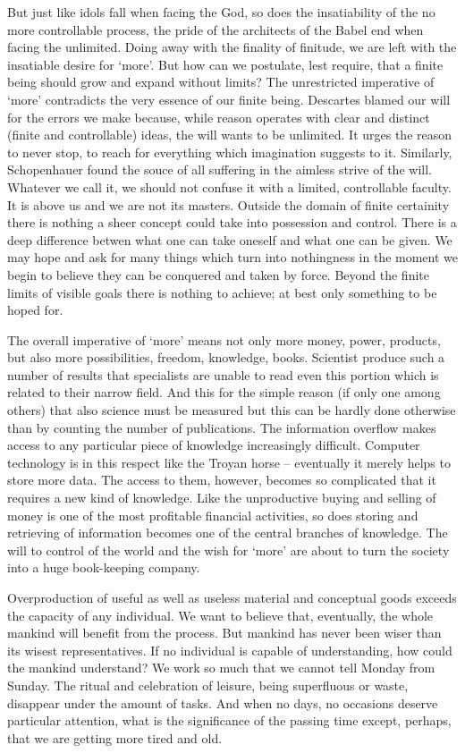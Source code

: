 But just like idols fall when facing the God, so does the insatiability of
the no more controllable process, the pride of the architects of the Babel
 end when facing the unlimited. Doing away with the
finality of finitude, we are left with the insatiable desire for `more'. 
But how can we postulate, lest require, that a finite being should grow and 
expand without limits? The unrestricted imperative of `more' contradicts the 
very essence of our finite being. 
Descartes
blamed our will for the errors we make because, while reason operates with
clear and distinct (finite and controllable) ideas, the will wants to be
unlimited. It urges the reason to never stop, to reach for everything which
imagination suggests to it. 
Similarly, Schopenhauer found the souce of all suffering in the aimless
strive of the will. Whatever we call it, we should not confuse it with 
a limited, controllable faculty. It is above us and we are not its masters.
Outside the domain of finite certainity there
is nothing a sheer concept could take into possession and control. There is a deep
difference betwen what one can take oneself and what one can be given.
We may hope and ask for many things which turn into nothingness in the moment we 
begin to believe they can be conquered and taken by force.
Beyond the finite limits of visible goals
there is nothing to achieve; at best only something to be hoped for.

The overall imperative of `more' means not only more money, power, products,
but also more possibilities, freedom, knowledge, books. 
Scientist produce such a number of results that specialists are unable to read
even this portion which is related to their narrow field. And this for the 
simple reason (if only one among others) that also science must be measured but
this can be hardly done otherwise than by counting the number of publications.
The information overflow makes access to any particular piece of knowledge
increasingly difficult. Computer technology is in this respect like the Troyan
horse -- eventually it merely helps to store more data. The access to them,
however, becomes so complicated that it requires a new kind of knowledge. Like
the unproductive buying and selling of money is one of the most profitable 
financial activities, so does storing and retrieving of information becomes
one of the central branches of knowledge. The will to control of the world and
the wish for `more' are about to turn the society into a huge book-keeping
company. 

Overproduction of useful as well as useless material and conceptual
goods exceeds the capacity of any individual. We want to believe that, 
eventually, the whole mankind will benefit from the process. But mankind has
never been wiser than its wisest representatives. If no individual is capable
of understanding, how could the mankind understand? We work so much that
we cannot tell Monday from Sunday. The ritual and celebration of leisure, being
superfluous or waste, disappear under the amount of tasks. And when no days,
no occasions deserve particular attention, what is the significance of the 
passing time except, perhaps, that we are getting more tired and old.

